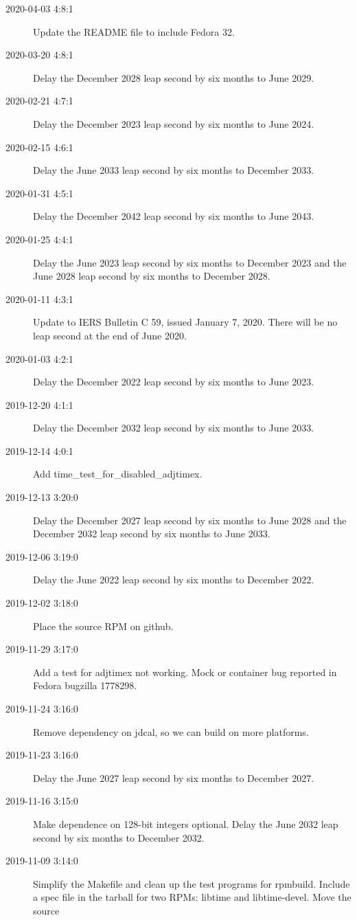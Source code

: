 \documentclass[letterpaper,twoside]{article}
\begin{document}
\begin{description}
\item[2020-04-03 4:8:1]Update the README file to include Fedora 32.
\item[2020-03-20 4:8:1]Delay the December 2028 leap second by six months
  to June 2029.
\item[2020-02-21 4:7:1]Delay the December 2023 leap second by six months
  to June 2024.
\item[2020-02-15 4:6:1]Delay the June 2033 leap second by six months
  to December 2033.
\item[2020-01-31 4:5:1]Delay the December 2042 leap second by six months
  to June 2043.
\item[2020-01-25 4:4:1]Delay the June 2023 leap second by six months
  to December 2023 and the June 2028 leap second by six months to December 2028.
\item[2020-01-11 4:3:1]Update to IERS Bulletin C 59, issued January 7, 2020.
  There will be no leap second at the end of June 2020.
\item[2020-01-03 4:2:1]Delay the December 2022 leap second by six months
  to June 2023.
\item[2019-12-20 4:1:1]Delay the December 2032 leap second by six months
  to June 2033.
\item[2019-12-14 4:0:1]Add {\ttfamily time\_test\_for\_disabled\_adjtimex}.
\item[2019-12-13 3:20:0]Delay the December 2027 leap second by six months
  to June 2028 and the December 2032 leap second by six months to June 2033.
\item[2019-12-06 3:19:0]Delay the June 2022 leap second by six months
  to December 2022.
\item[2019-12-02 3:18:0]Place the source RPM on github.
\item[2019-11-29 3:17:0]Add a test for adjtimex not working.
  Mock or container bug reported in Fedora bugzilla 1778298.
\item[2019-11-24 3:16:0]Remove dependency on jdcal, so we can build
  on more platforms.
\item[2019-11-23 3:16:0]Delay the June 2027 leap second by six months
  to December 2027.
\item[2019-11-16 3:15:0]Make dependence on 128-bit integers optional.
  Delay the June 2032 leap second by six months to December 2032.
\item[2019-11-09 3:14:0]Simplify the Makefile and clean up the
  test programs for rpmbuild.  Include a spec file in the tarball
  for two RPMs: libtime and libtime-devel.  Move the source

\end{description}
\end{document}
